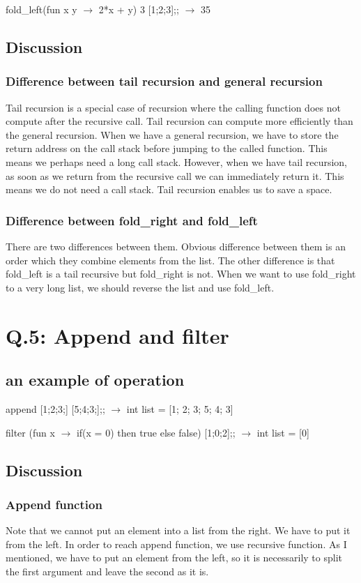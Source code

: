 \documentclass[uplatex,12pt]{jsarticle}
\begin{document}
fold\_left(fun x y $\rightarrow$ 2*x + y) 3 [1;2;3];; $\rightarrow$ 35

\subsection{Discussion}
\subsubsection{Difference between tail recursion and general recursion}
Tail recursion is a special case of recursion where the calling function does not compute after the recursive call. Tail recursion can compute more efficiently than the general recursion. When we have a general recursion, we have to store the return address on the call stack before jumping to the called function. This means we perhaps need a long call stack. However, when we have tail recursion, as soon as we return from the recursive call we can immediately return it. This means we do not need a call stack. Tail recursion enables us to save a space.

\subsubsection{Difference between fold\_right and fold\_left}
There are two differences between them. Obvious difference between them is an order which they combine elements from the list. The other difference is that fold\_left is a tail recursive but fold\_right is not. When we want to use fold\_right to a very long list, we should reverse the list and use fold\_left.


\section {Q.5: Append and filter}
\subsection {an example of operation}
append [1;2;3;] [5;4;3;];; $\rightarrow$ int list = [1; 2; 3; 5; 4; 3]

filter (fun x $\rightarrow$ if(x = 0) then true else false) [1;0;2];; $\rightarrow$ int list = [0]

\subsection{Discussion}

\subsubsection{Append function}
Note that we cannot put an element into a list from the right. We have to put it from the left. In order to reach append function, we use recursive function. As I mentioned, we have to put an element from the left, so it is necessarily to split the first argument and leave the second as it is.
\end{document}

